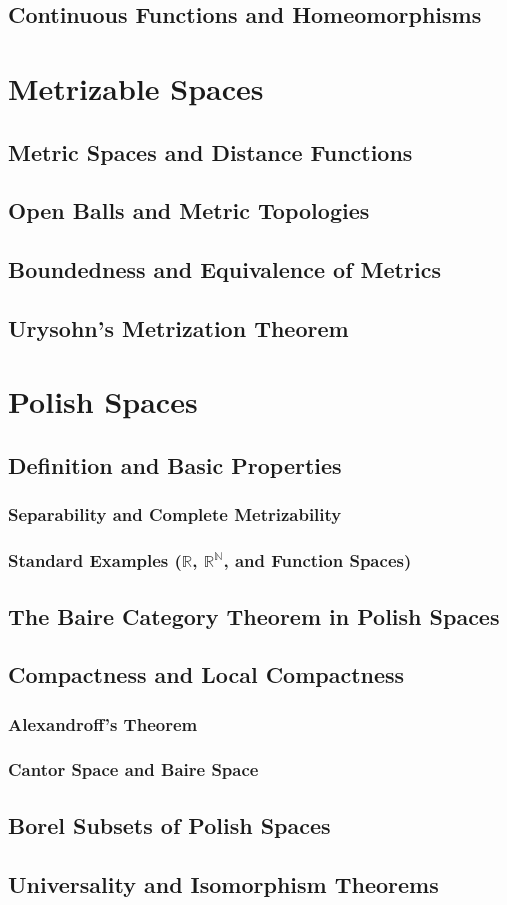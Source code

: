 \documentclass[10pt,a4paper]{article}
\begin{document}
		\subsection{Continuous Functions and Homeomorphisms}
	\section{Metrizable Spaces}
		\subsection{Metric Spaces and Distance Functions}
		\subsection{Open Balls and Metric Topologies}
		\subsection{Boundedness and Equivalence of Metrics}
		\subsection{Urysohn's Metrization Theorem}
	\section{Polish Spaces}
		\subsection{Definition and Basic Properties}
			\subsubsection{Separability and Complete Metrizability}
			\subsubsection{Standard Examples ($\mathbb{R}$, $\mathbb{R}^\mathbb{N}$, and Function Spaces)}
		\subsection{The Baire Category Theorem in Polish Spaces}
		\subsection{Compactness and Local Compactness}
			\subsubsection{Alexandroff's Theorem}
			\subsubsection{Cantor Space and Baire Space}
		\subsection{Borel Subsets of Polish Spaces}
		\subsection{Universality and Isomorphism Theorems}
\end{document}
